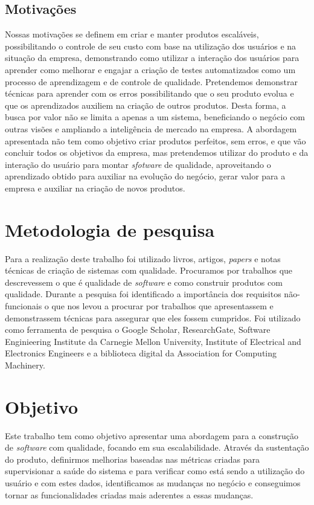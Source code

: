     \section{Motivações}
      Nossas motivações se definem em criar e manter produtos escaláveis,
      possibilitando o controle de seu custo com base na utilização
      dos usuários e na situação da empresa, demonstrando como utilizar a interação
      dos usuários para aprender como melhorar e engajar a criação de testes
      automatizados como um processo de aprendizagem e de controle de qualidade. \newline
      Pretendemos demonstrar técnicas para aprender com os erros possibilitando
      que o seu produto evolua e que os aprendizados auxiliem na criação de outros
      produtos. Desta forma, a busca por valor não se limita a apenas a um sistema,
      beneficiando o negócio com outras visões e ampliando a inteligência de mercado
      na empresa. A abordagem apresentada não tem como objetivo criar produtos perfeitos,
      sem erros, e que vão concluir todos os objetivos da empresa, mas pretendemos
      utilizar do produto e da interação do usuário para montar \textit{sfotware}
      de qualidade, aproveitando o aprendizado obtido para auxiliar na evolução
      do negócio, gerar valor para a empresa e auxiliar na criação de novos produtos.

  \chapter{Metodologia de pesquisa}
    Para a realização deste trabalho foi utilizado livros, artigos, \textit{papers}
    e notas técnicas de criação de sistemas com qualidade. Procuramos por trabalhos
    que descrevessem o que é qualidade de \textit{software} e como construir
    produtos com qualidade. Durante a pesquisa foi identificado a importância dos
    requisitos não-funcionais o que nos levou a procurar por trabalhos que
    apresentassem e demonstrassem técnicas para assegurar que eles fossem
    cumpridos. \newline
    Foi utilizado como ferramenta de pesquisa o Google Scholar, ResearchGate,
    Software Enginieering Institute da Carnegie Mellon University, Institute of
    Electrical and Electronics Engineers e a biblioteca digital da Association
    for Computing Machinery.

  \chapter{Objetivo}
    Este trabalho tem como objetivo apresentar uma abordagem para a construção de
    \textit{software} com qualidade, focando em sua escalabilidade. Através da
    sustentação do produto, definirmos melhorias baseadas nas métricas criadas
    para supervisionar a saúde do sistema e para verificar como está sendo a
    utilização do usuário e com estes dados, identificamos as mudanças no negócio
    e conseguimos tornar as funcionalidades criadas mais aderentes a essas mudanças.
